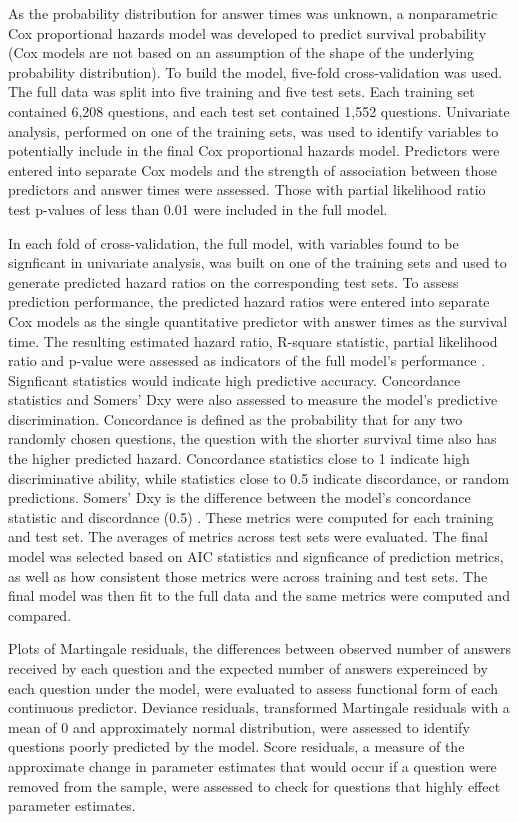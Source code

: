 \documentclass[12pt]{article}
\begin{document}
As the probability distribution for answer times was unknown, a nonparametric Cox proportional hazards model was developed to predict survival probability (Cox models are not based on an assumption of the shape of the underlying probability distribution). To build the model, five-fold cross-validation was used. The full data was split into five training and five test sets. Each training set contained 6,208 questions, and each test set contained 1,552 questions. Univariate analysis, performed on one of the training sets, was used to identify variables to potentially include in the final Cox proportional hazards model. Predictors were entered into separate Cox models and the strength of association between those predictors and answer times were assessed. Those with partial likelihood ratio test p-values of less than 0.01 were included in the full model.

In each fold of cross-validation, the full model, with variables found to be signficant in univariate analysis, was built on one of the training sets and used to generate predicted hazard ratios on the corresponding test sets. To assess prediction performance, the predicted hazard ratios were entered into separate Cox models as the single quantitative predictor with answer times as the survival time. The resulting estimated hazard ratio, R-square statistic, partial likelihood ratio and p-value were assessed as indicators of the full model's performance \citep{Chen}. Signficant statistics would indicate high predictive accuracy. Concordance statistics and Somers' Dxy were also assessed to measure the model's predictive discrimination. Concordance is defined as the probability that for any two randomly chosen questions, the question with the shorter survival time also has the higher predicted hazard. Concordance statistics close to 1 indicate high discriminative ability, while statistics close to 0.5 indicate discordance, or random predictions. Somers' Dxy is the difference between the model's concordance statistic and discordance (0.5) \citep{Harrell2015}. These metrics were computed for each training and test set. The averages of metrics across test sets were evaluated. The final model was selected based on AIC statistics and signficance of prediction metrics, as well as how consistent those metrics were across training and test sets. The final model was then fit to the full data and the same metrics were computed and compared. 

Plots of Martingale residuals, the differences between observed number of answers received by each question and the expected number of answers expereinced by each question under the model, were evaluated to assess functional form of each continuous predictor. Deviance residuals, transformed Martingale residuals with a mean of 0 and approximately normal distribution, were assessed to identify questions poorly predicted by the model. Score residuals, a measure of the approximate change in parameter estimates that would occur if a question were removed from the sample, were assessed to check for questions that highly effect parameter estimates. 
\end{document}
